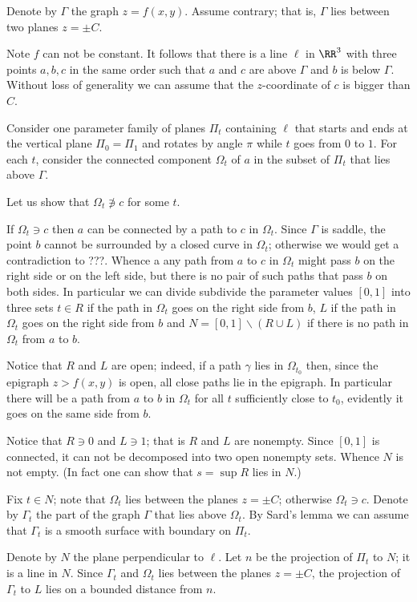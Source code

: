 Denote by $\Gamma$ the graph $z=f(x,y)$.
Assume contrary; that is, $\Gamma$ lies between two planes $z=\pm C$.

Note $f$ can not be constant.
It follows that there is a line $\ell$ in $\RR^3$ with three points $a,b,c$ in the same order such that 
$a$ and $c$ are above $\Gamma$ and $b$ is below $\Gamma$.
Without loss of generality we can assume that the $z$-coordinate of $c$ is bigger than $C$.

Consider one parameter family of planes $\Pi_t$ containing $\ell$ that starts and ends at the vertical plane $\Pi_0=\Pi_1$ and rotates by angle $\pi$ while $t$ goes from $0$ to $1$.
For each $t$, consider the connected component $\Omega_t$ of $a$ in the subset of $\Pi_t$ that lies above $\Gamma$.

Let us show that $\Omega_t\not\ni c$ for some $t$.

If  $\Omega_t\ni c$ then $a$ can be connected by a path to $c$ in $\Omega_t$.
Since $\Gamma$ is saddle, the point $b$ cannot be surrounded by a closed curve in $\Omega_t$;
otherwise we would get a contradiction to ???.
Whence a any path from $a$ to $c$ in $\Omega_t$ might pass $b$ on the right side or on the left side,
but there is no pair of such paths that pass $b$ on both sides.
In particular we can divide subdivide the parameter values $[0,1]$ into three sets $t\in R$ if the path  in $\Omega_t$  goes on the right side from $b$,  $L$ if the path in $\Omega_t$ goes on the right side from $b$ and $N=[0,1]\backslash(R\cup L)$ if there is no path in $\Omega_t$ from $a$ to $b$.

Notice that $R$ and $L$ are open; indeed, if a path $\gamma$ lies in $\Omega_{t_0}$ then, since the epigraph $z>f(x,y)$ is open, all close paths lie in the epigraph.
In particular there will be a path from $a$ to $b$ in $\Omega_t$ for all $t$ sufficiently close to $t_0$,
evidently it goes on the same side from $b$.

Notice that $R\ni 0$ and $L\ni 1$; that is $R$ and $L$ are nonempty.
Since $[0,1]$ is connected, it can not be decomposed into two open nonempty sets.
Whence $N$ is not empty.
(In fact one can show that $s=\sup R$ lies in $N$.)


Fix $t\in N$; note that $\Omega_t$ lies between the planes $z=\pm C$;
otherwise $\Omega_t\ni c$.
Denote by $\Gamma_t$ the part of the graph $\Gamma$ that lies above $\Omega_t$.
By Sard's lemma we can assume that $\Gamma_t$ is a smooth surface with boundary on $\Pi_t$.

Denote by $N$ the plane perpendicular to $\ell$.
Let $n$ be the projection of $\Pi_t$ to $N$; 
it is a line in $N$.
Since $\Gamma_t$ and $\Omega_t$ lies between the planes $z=\pm C$, the projection of $\Gamma_t$ to $L$ lies on a bounded distance from $n$.

